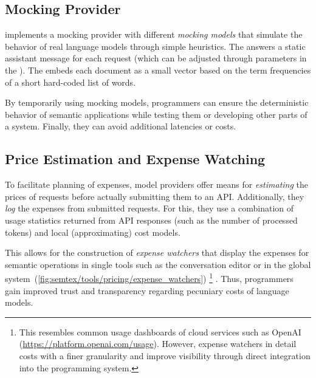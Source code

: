 \subsection*{Mocking Provider}
\label{sec:semtex/tools/mocking}

\semtex implements a mocking provider with different \emph{mocking models} that simulate the behavior of real language models through simple heuristics.
The  answers a static assistant message for each request (which can be adjusted through parameters in the ).
The  embeds each document as a small vector based on the term frequencies of a short hard-coded list of words.

By temporarily using mocking models, programmers can ensure the deterministic behavior of semantic applications while testing them or developing other parts of a system.
Finally, they can avoid additional latencies or costs.

\subsection*{Price Estimation and Expense Watching}
\label{sec:semtex/tools/pricing}

To facilitate planning of expenses, model providers offer means for \emph{estimating} the prices of requests before actually submitting them to an API.
Additionally, they \emph{log} the expenses from submitted requests.
For this, they use a combination of usage statistics returned from API responses (such as the number of processed tokens) and local (approximating) cost models.

This allows for the construction of \emph{expense watchers} that display the expenses for semantic operations in single tools such as the conversation editor or in the global system~(\cref{fig:semtex/tools/pricing/expense_watchers})%
\footnote{%
	This resembles common usage dashboards of cloud services such as OpenAI (\url{https://platform.openai.com/usage}).
	However, expense watchers in \semtex detail costs with a finer granularity and improve visibility through direct integration into the programming system.
}%
.
Thus, programmers gain improved trust and transparency regarding pecuniary costs of language models.

